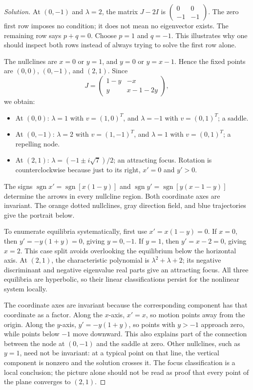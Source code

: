 \documentclass[10pt]{amsart}
\newenvironment{solution}
{\begin{proof}[Solution]}
{\end{proof}}
\begin{document}
\begin{enumerate}[label=\arabic*), leftmargin=*, itemsep=1em]
\begin{solution}
At $(0,-1)$ and $\lambda=2$, the matrix $J-2I$ is
$\begin{pmatrix}0&0\\-1&-1\end{pmatrix}$. The zero first row imposes no condition; it does not mean no eigenvector exists. The remaining row says $p+q=0$. Choose $p=1$ and $q=-1$. This illustrates why one should inspect both rows instead of always trying to solve the first row alone.


The nullclines are $x=0$ or $y=1$, and $y=0$ or $y=x-1$. Hence the fixed points are $(0,0)$, $(0,-1)$, and $(2,1)$. Since
\[
J=\begin{pmatrix}1-y&-x\\y&x-1-2y\end{pmatrix},
\]
we obtain:
\begin{itemize}
\item At $(0,0)$: $\lambda=1$ with $v=(1,0)^T$, and $\lambda=-1$ with $v=(0,1)^T$; a saddle.
\item At $(0,-1)$: $\lambda=2$ with $v=(1,-1)^T$, and $\lambda=1$ with $v=(0,1)^T$; a repelling node.
\item At $(2,1)$: $\lambda=(-1\pm i\sqrt7)/2$; an attracting focus. Rotation is counterclockwise because just to its right, $x'=0$ and $y'>0$.
\end{itemize}
The signs $\operatorname{sgn}x'=\operatorname{sgn}[x(1-y)]$ and $\operatorname{sgn}y'=\operatorname{sgn}[y(x-1-y)]$ determine the arrows in every nullcline region. Both coordinate axes are invariant. The orange dotted nullclines, gray direction field, and blue trajectories give the portrait below.

To enumerate equilibria systematically, first use $x'=x(1-y)=0$. If $x=0$, then $y'=-y(1+y)=0$, giving $y=0,-1$. If $y=1$, then $y'=x-2=0$, giving $x=2$. This case split avoids overlooking the equilibrium below the horizontal axis. At $(2,1)$, the characteristic polynomial is $\lambda^2+\lambda+2$; its negative discriminant and negative eigenvalue real parts give an attracting focus. All three equilibria are hyperbolic, so their linear classifications persist for the nonlinear system locally.

The coordinate axes are invariant because the corresponding component has that coordinate as a factor. Along the $x$-axis, $x'=x$, so motion points away from the origin. Along the $y$-axis, $y'=-y(1+y)$, so points with $y>-1$ approach zero, while points below $-1$ move downward. This also explains part of the connection between the node at $(0,-1)$ and the saddle at zero. Other nullclines, such as $y=1$, need not be invariant: at a typical point on that line, the vertical component is nonzero and the solution crosses it. The focus classification is a local conclusion; the picture alone should not be read as proof that every point of the plane converges to $(2,1)$.



\end{solution}
\end{enumerate}
\end{document}
